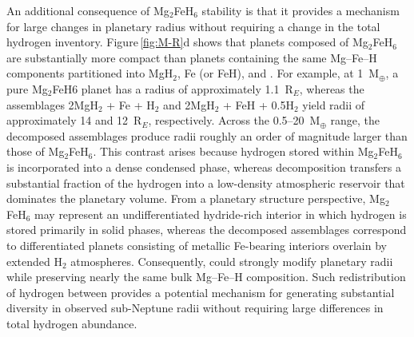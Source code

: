 \documentclass[draft,jgrga,12pt]{agujournal2019}
\begin{document}
An additional consequence of Mg$_2$FeH$_6$ stability is that it provides a mechanism for large changes in planetary radius without requiring a change in the total hydrogen inventory.
Figure\,\ref{fig:M-R}d shows that planets composed of Mg$_2$FeH$_6$ are substantially more compact than planets containing the same Mg--Fe--H components partitioned into MgH$_2$, Fe (or FeH), and .
For example, at 1~M$_{\oplus}$, a pure Mg$_2$FeH$6$ planet has a radius of approximately 1.1~R$_E$, whereas the assemblages 2MgH$_2$ + Fe + H$_2$ and 2MgH$_2$ + FeH + 0.5H$_2$ yield radii of approximately 14 and 12~R$_E$, respectively.
Across the 0.5--20~M$_{\oplus}$ range, the decomposed assemblages produce radii roughly an order of magnitude larger than those of Mg$_2$FeH$_6$.
This contrast arises because hydrogen stored within Mg$_2$FeH$_6$ is incorporated into a dense condensed phase, whereas decomposition transfers a substantial fraction of the hydrogen into a low-density atmospheric reservoir that dominates the planetary volume.
From a planetary structure perspective, Mg$_2$FeH$_6$ may represent an undifferentiated hydride-rich interior in which hydrogen is stored primarily in solid phases, whereas the decomposed assemblages correspond to differentiated planets consisting of metallic Fe-bearing interiors overlain by extended H$_2$ atmospheres.
Consequently,  could strongly modify planetary radii while preserving nearly the same bulk Mg--Fe--H composition.
Such redistribution of hydrogen between  provides a potential mechanism for generating substantial diversity in observed sub-Neptune radii without requiring large differences in total hydrogen abundance.


\end{document}
